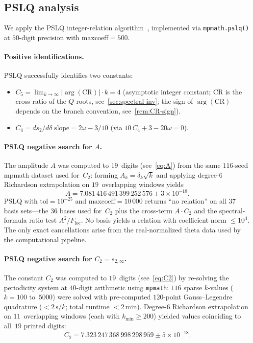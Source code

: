 \documentclass[11pt,a4paper]{article}
\theoremstyle{plain}
\theoremstyle{definition}
\theoremstyle{remark}
\begin{document}
\subsection{PSLQ analysis}\label{sec:pslq}
We apply the PSLQ integer-relation algorithm~\cite{Fer99}, implemented
via \texttt{mpmath.pslq()} at $50$-digit precision with
$\mathrm{maxcoeff} = 500$.

\paragraph{Positive identifications.}
PSLQ successfully identifies two constants:
\begin{itemize}[nosep]
\item $C_5 = \lim_{k\to\infty} \lvert\arg(\mathrm{CR})\rvert \cdot k = 4$
  (asymptotic integer constant;
  $\mathrm{CR}$ is the cross-ratio of the $Q$-roots,
  see~\cref{sec:spectral-inv}; the sign of $\arg(\mathrm{CR})$
  depends on the branch convention, see~\cref{rem:CR-sign}).
\item $C_4 = ds_2/d\delta \text{ slope} = 2\omega - 3/10$\quad
  (via $10\,C_4 + 3 - 20\omega = 0$).
\end{itemize}

\paragraph{PSLQ negative search for $A$.}
The amplitude $A$ was computed to $19$~digits
(see~\eqref{eq:A}) from the same $116$-seed mpmath dataset
used for~$C_2$: forming $A_k = \delta_k\sqrt{k}$ and applying
degree-$6$ Richardson extrapolation on $19$~overlapping windows
yields
\[
  A = 7.081\,416\,491\,399\,252\,576 \pm 3 \times 10^{-18}.
\]
PSLQ with $\mathrm{tol} = 10^{-25}$ and
$\mathrm{maxcoeff} = 10\,000$ returns ``no relation''
on all $37$ basis sets---the $36$ bases used for~$C_2$
plus the cross-term $A \cdot C_2$ and the spectral-formula
ratio test $A^2 / F_{\mathrm{loc}}$.
No basis yields a relation with coefficient norm $\leq 10^4$.
The only exact cancellations arise from the real-normalized theta data
used by the computational pipeline.

\paragraph{PSLQ negative search for $C_2 = s_{2,\infty}$.}
The constant $C_2$ was computed to $19$~digits
(see~\eqref{eq:C2}) by re-solving the periodicity system at
$40$-digit arithmetic using \texttt{mpmath}:
$116$ sparse $k$-values ($k = 100$ to~$5000$) were solved
with pre-computed $120$-point Gauss--Legendre quadrature
($<2\,\text{s}/k$; total runtime $< 2\,\text{min}$).
Degree-$6$ Richardson extrapolation on $11$~overlapping windows
(each with $k_{\min} \geq 200$) yielded values coinciding to
all~$19$ printed digits:
\[
  C_2 = 7.323\,247\,368\,998\,298\,959 \pm 5 \times 10^{-18}.
\]
\end{document}
